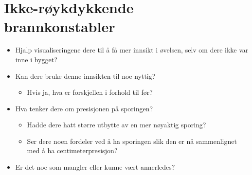 \documentclass[../Main/thesis.tex]{subfiles}
\begin{document}
\section*{Ikke-røykdykkende brannkonstabler}
\begin{itemize}
	\item Hjalp visualiseringene dere til å få mer innsikt i øvelsen, selv om dere ikke var inne i bygget?
	\item Kan dere bruke denne innsikten til noe nyttig?
\begin{itemize}
	\item Hvis ja, hva er forskjellen i forhold til før?
\end{itemize}
\item Hva tenker dere om presisjonen på sporingen?
\begin{itemize}
	\item Hadde dere hatt større utbytte av en mer nøyaktig sporing?
	\item Ser dere noen fordeler ved å ha sporingen slik den er nå sammenlignet med å ha centimeterpresisjon?
\end{itemize}
\item Er det noe som mangler eller kunne vært annerledes?
\end{itemize}

\blankpage
\end{document}
